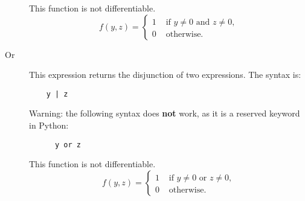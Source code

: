 \documentclass[12pt,a4paper]{article}
\begin{document}
\begin{description}
    This function is not differentiable.
    \[
    f(y, z) = \left\{
    \begin{aligned}
      1 & \text{ if } y \neq 0 \text{ and } z \neq 0, \\
      0 & \text{ otherwise.}
    \end{aligned}
    \right.
    \]
\item[Or]   This expression returns the disjunction of two expressions. The syntax is:
    \begin{lstlisting}
    y | z 
    \end{lstlisting}
    Warning: the following syntax does \textbf{not} work, as it is a reserved keyword in Python:
    \begin{lstlisting}
      y or z 
    \end{lstlisting}
    
    This function is not differentiable.
    \[
    f(y, z) = \left\{
    \begin{aligned}
      1 & \text{ if } y \neq 0 \text{ or } z \neq 0, \\
      0 & \text{ otherwise.}
    \end{aligned}
    \right.
    \]
  \end{description}
\end{document}
